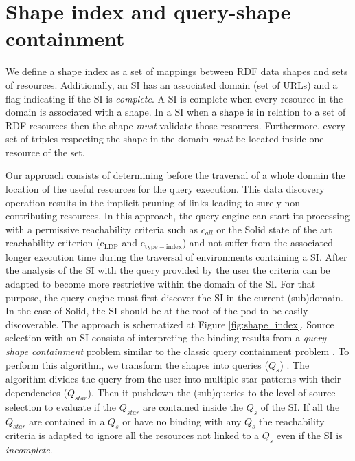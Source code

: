 \section{Shape index and query-shape containment}

We define a shape index as a set of mappings between RDF data shapes and sets of resources.
Additionally, an SI has an associated domain (set of URLs)
and a flag indicating if the SI is \emph{complete}.
A SI is complete when every resource in the domain is associated with a shape.
In a SI when a shape is in relation to a set of RDF resources then the shape \emph{must} validate those resources.
Furthermore, every set of triples respecting the shape in the domain \emph{must} be located inside one resource of the set.

Our approach consists of determining before the traversal of a whole domain the location of the useful resources for the query execution.
This data discovery operation results in the implicit pruning of links leading to surely non-contributing resources.
In this approach, the query engine can start its processing with a permissive reachability criteria
such as $c_{all}$ \cite{Hartig2012} or the Solid state of the art reachability criterion ($\mathrm{c_{LDP}}$ and $\mathrm{c_{type-index}}$) \cite{Taelman2023}
and not suffer from the associated longer execution time during the traversal of environments containing a SI.
After the analysis of the SI with the query provided by the user the criteria can be adapted to become more restrictive within the domain of the SI.
For that purpose, the query engine must first discover the SI in the current (sub)domain.
In the case of Solid, the SI should be at the root of the pod to be easily discoverable.
The approach is schematized at Figure \ref{fig:shape_index}.
Source selection with an SI consists of interpreting the binding results from a \emph{query-shape containment} problem similar to the classic query containment problem \cite{afariQCE, Spasi2023}.
To perform this algorithm, we transform the shapes into queries ($Q_{s}$) \cite{labragayo2017validating, Delva2021}.
The algorithm divides the query from the user into multiple star patterns with their dependencies ($Q_{star}$).
Then it pushdown \cite{Yang2021FlexPushdownDBHP} the (sub)queries to the level of source selection to evaluate if the $Q_{star}$ are contained inside the $Q_s$ of the SI.
If all the $Q_{star}$ are contained in a $Q_{s}$ or have no binding with any $Q_{s}$
the reachability criteria is adapted to ignore all the resources not linked to a $Q_{s}$ even if the SI is \emph{incomplete}.
